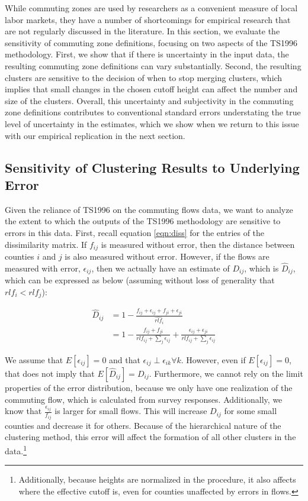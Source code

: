 While commuting zones are used by researchers as a convenient measure of local labor markets, they have a number of shortcomings for empirical research that are not regularly discussed in the literature. In this section, we evaluate the sensitivity of commuting zone definitions, focusing on two aspects of the TS1996 methodology. First, we show that if there is uncertainty in the input data, the resulting commuting zone definitions can vary substantially. Second, the resulting clusters are sensitive to the decision of when to stop merging clusters, which implies that small changes in the chosen cutoff height can affect the number and size of the clusters. Overall, this uncertainty and subjectivity in the commuting zone definitions contributes to conventional standard errors understating the true level of uncertainty in the estimates, which we show when we return to this issue with our empirical replication in the next section.

\subsection{Sensitivity of Clustering Results to Underlying Error}

Given the reliance of TS1996 on the commuting flows data, we want to analyze the extent to which the outputs of the TS1996 methodology are sensitive to errors in this data. First, recall equation \ref{eqn:diss} for the entries of the dissimilarity matrix. If $f_{ij}$ is measured without error, then the distance between counties $i$ and $j$ is also measured without error. However, if the flows are measured with error, $\epsilon_{ij}$, then we actually have an estimate of $D_{ij}$, which is $\hat{D}_{ij}$, which can be expressed as below (assuming without loss of generality that $rlf_i < rlf_j$):


\begin{align*}
\hat{D}_{ij} &= 1 - \frac{f_{ij} + \epsilon_{ij} + f_{ji} + \epsilon_{ji}}{\hat{rlf}_i} \\
&= 1- \frac{f_{ij} + f_{ji}}{rlf_{ij} + \sum_j \epsilon_{ij}} +  \frac{\epsilon_{ij} + \epsilon_{ji}}{rlf_{ij} + \sum_j \epsilon_{ij}}
\end{align*}

We assume that $E[\epsilon_{ij}]=0$ and that $\epsilon_{ij} \perp \epsilon_{ik} \forall k$. However, even if $E[\epsilon_{ij}]=0$, that does not imply that $E[\hat{D}_{ij}] = D_{ij}$. Furthermore, we cannot rely on the limit properties of the error distribution, because we only have one realization of the commuting flow, which is calculated from survey responses. Additionally, we know that $\frac{\epsilon_{ij}}{f_{ij}}$ is larger for small flows. This will increase $D_{ij}$ for some small counties and decrease it for others. Because of the hierarchical nature of the clustering method, this error will affect the formation of all other clusters in the data.\footnote{Additionally, because heights are normalized in the procedure, it also affects where the effective cutoff is, even for counties unaffected by errors in flows.}

